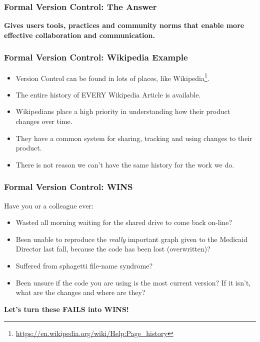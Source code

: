 \documentclass{beamer}
\begin{document}
\begin{frame} %
  \frametitle{Formal Version Control: The Answer}

  \textbf{Gives users tools, practices and community norms that enable
    more effective collaboration and communication.}
  
 \end{frame}
 
\begin{frame} %
  \frametitle{Formal Version Control: Wikipedia Example}
  
  \begin{itemize}
  \item Version Control can be found in lots of places, like
    Wikipedia\footnote{\url{https://en.wikipedia.org/wiki/Help:Page_history}}.
  \item The entire history of EVERY Wikipedia Article is available.
  \item Wikipedians place a high priority in understanding how their
    product changes over time.
  \item They have a common system for sharing, tracking and using
  changes to their product.
  \item There is not reason we can't have the same history for the
    work we do.
  \end{itemize}

\end{frame}

\begin{frame}  %
  \frametitle{Formal Version Control: WINS}
  {\large Have you or a colleague ever:}
  \bigskip
  \begin{itemize}
  \item Wasted all morning waiting for the shared drive to come back
    on-line?
  \item Been unable to reproduce the \emph{really} important graph
    given to the Medicaid Director last fall, because the code has
    been lost (overwritten)?
  \item Suffered from sphagetti file-name syndrome?
  \item Been unsure if the code you are using is the most current
    version? If it isn't, what are the changes and where are they?
  \end{itemize}

  \begin{center}
    \textbf{Let's turn these FAILS into WINS!}
  \end{center}
\end{frame}
\end{document}
